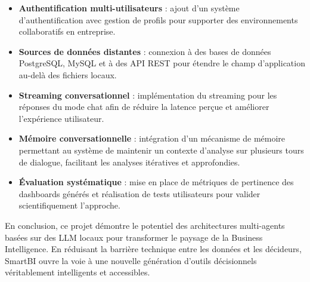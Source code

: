 \begin{itemize}[leftmargin=2cm]
    \item \textbf{Authentification multi-utilisateurs} : ajout d'un système d'authentification avec gestion de profils pour supporter des environnements collaboratifs en entreprise.
    \item \textbf{Sources de données distantes} : connexion à des bases de données PostgreSQL, MySQL et à des API REST pour étendre le champ d'application au-delà des fichiers locaux.
    \item \textbf{Streaming conversationnel} : implémentation du streaming pour les réponses du mode chat afin de réduire la latence perçue et améliorer l'expérience utilisateur.
    \item \textbf{Mémoire conversationnelle} : intégration d'un mécanisme de mémoire permettant au système de maintenir un contexte d'analyse sur plusieurs tours de dialogue, facilitant les analyses itératives et approfondies.
    \item \textbf{Évaluation systématique} : mise en place de métriques de pertinence des dashboards générés et réalisation de tests utilisateurs pour valider scientifiquement l'approche.
\end{itemize}

En conclusion, ce projet démontre le potentiel des architectures multi-agents basées sur des LLM locaux pour transformer le paysage de la Business Intelligence. En réduisant la barrière technique entre les données et les décideurs, SmartBI ouvre la voie à une nouvelle génération d'outils décisionnels véritablement intelligents et accessibles.

